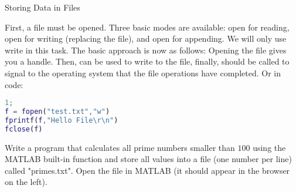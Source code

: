 \begin{task}{Storing Data in Files}{}{}
\begin{enumerate}
{    First, a file must be opened. Three basic modes are available: open for reading, open for writing (replacing the file), and open for appending. We will only use write in this task. The basic approach is now as follows: Opening the file gives you a handle. Then,  can be used to write to the file, finally,  should be called to signal to the operating system that the file operations have completed. Or in code:
   \begin{lstlisting}[language=MATLAB]
1;      
f = fopen("test.txt","w")
fprintf(f,"Hello File\r\n")
fclose(f)
\end{lstlisting}
 Write a program that calculates all prime numbers smaller than $100$ using the MATLAB built-in function  and store all values into a file (one number per line) called "primes.txt". Open the file in MATLAB (it should appear in the browser on the left).}

  \end{enumerate}



\end{task}
